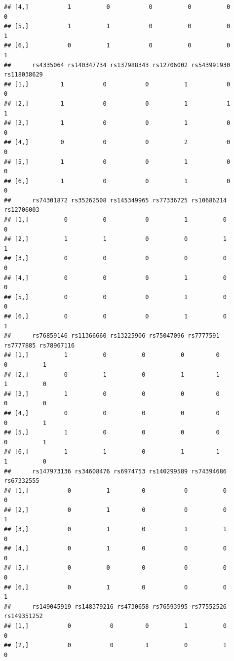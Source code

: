 \documentclass[
]{article}
\begin{document}
\begin{verbatim}
## [4,]           1          0           0          0          0          0
## [5,]           1          1           0          0          0          1
## [6,]           0          1           0          0          0          1
##      rs4335064 rs140347734 rs137988343 rs12706002 rs543991930 rs118038629
## [1,]         1           0           0          1           0           0
## [2,]         1           0           0          1           1           1
## [3,]         1           0           0          1           0           0
## [4,]         0           0           0          2           0           0
## [5,]         1           0           0          1           0           0
## [6,]         1           0           0          1           0           0
##      rs74301872 rs35262508 rs145349965 rs77336725 rs10686214 rs12706003
## [1,]          0          0           0          1          0          0
## [2,]          1          1           0          0          1          1
## [3,]          0          0           0          0          0          0
## [4,]          0          0           0          1          0          0
## [5,]          0          0           0          1          0          0
## [6,]          0          0           0          1          0          1
##      rs76859146 rs11366660 rs13225906 rs75047096 rs7777591 rs7777885 rs78967116
## [1,]          1          0          0          0         0         0          1
## [2,]          0          1          0          1         1         1          0
## [3,]          1          0          0          0         0         0          0
## [4,]          0          0          0          0         0         0          1
## [5,]          1          0          0          0         0         0          1
## [6,]          1          1          0          1         1         1          0
##      rs147973136 rs34608476 rs6974753 rs140299589 rs74394686 rs67332555
## [1,]           0          1         0           0          0          0
## [2,]           0          1         0           0          0          1
## [3,]           0          1         0           1          1          0
## [4,]           0          1         0           0          0          0
## [5,]           0          0         0           0          0          0
## [6,]           0          1         0           0          0          1
##      rs149045919 rs148379216 rs4730658 rs76593995 rs77552526 rs149351252
## [1,]           0           0         0          1          0           0
## [2,]           0           0         1          0          1           0

\end{verbatim}
\end{document}
